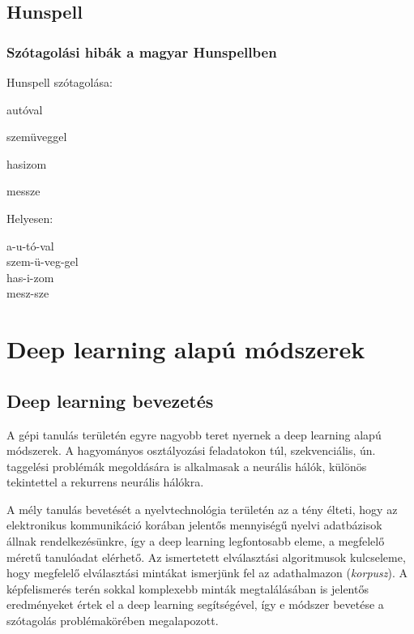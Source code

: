 \documentclass[a4paper, magyar]{article}
\begin{document}
\subsection{Hunspell}
\subsubsection{Szótagolási hibák a magyar Hunspellben}


\begin{minipage}{0.5\textwidth}
	Hunspell szótagolása:
\begin{checkhyphens}
	autóval
	
	szemüveggel
	
	hasizom
	
	messze
\end{checkhyphens} 		
\end{minipage}\noindent
\begin{minipage}{0.5\textwidth}
	Helyesen:

	a-u-tó-val\\
	szem-ü-veg-gel\\
	has-i-zom\\
	mesz-sze
\end{minipage}


\section{Deep learning alapú módszerek}
\subsection{Deep learning bevezetés}
A gépi tanulás területén egyre nagyobb teret nyernek a deep learning alapú módszerek. A hagyományos osztályozási feladatokon túl, szekvenciális, ún. taggelési problémák megoldására is alkalmasak a neurális hálók, különös tekintettel a rekurrens neurális hálókra.

A mély tanulás bevetését a nyelvtechnológia területén az a tény élteti, hogy az elektronikus kommunikáció korában jelentős mennyiségű nyelvi adatbázisok állnak rendelkezésünkre, így a deep learning legfontosabb eleme, a megfelelő méretű tanulóadat elérhető. Az ismertetett elválasztási algoritmusok kulcseleme, hogy megfelelő elválasztási mintákat ismerjünk fel az adathalmazon (\textit{korpusz}). A képfelismerés terén sokkal komplexebb minták megtalálásában is jelentős eredményeket értek el a deep learning segítségével, így e módszer bevetése a szótagolás problémakörében megalapozott.
\end{document}
